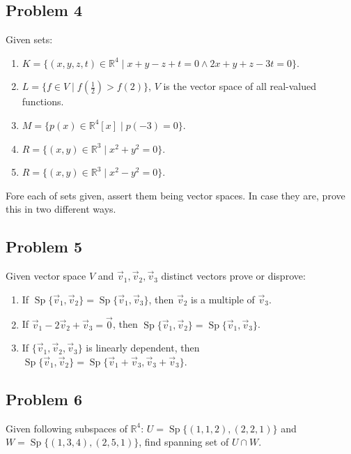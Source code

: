 \documentclass[11pt]{article}
\DeclareMathOperator{\Sp}{Sp}
\begin{document}
\subsection{Problem 4}
\label{sec-1-4}
Given sets:
\begin{enumerate}
\item $K = \{(x,y,z,t) \in \mathbb{R}^4\;|\; x+y-z+t=0 \land 2x+y+z-3t=0\}$.
\item $L = \{f \in V\;|\; f\left(\frac{1}{2}\right)>f(2)\}$, $V$ is the vector
space of all real-valued functions.
\item $M = \{p(x) \in \mathbb{R}^4[x]\;|\; p(-3) = 0\}$.
\item $R = \{(x,y) \in \mathbb{R}^3\;|\; x^2 + y^2 = 0\}$.
\item $R = \{(x,y) \in \mathbb{R}^3\;|\; x^2 - y^2 = 0\}$.
\end{enumerate}

Fore each of sets given, assert them being vector spaces.  In case they are,
prove this in two different ways.

\subsection{Problem 5}
\label{sec-1-5}
Given vector space $V$ and $\vec{v}_1, \vec{v}_2, \vec{v}_3$ distinct vectors
prove or disprove:
\begin{enumerate}
\item If $\Sp\{\vec{v}_1, \vec{v}_2\} = \Sp\{\vec{v}_1, \vec{v}_3\}$, then
$\vec{v}_2$ is a multiple of $\vec{v}_3$.
\item If $\vec{v}_1 - 2\vec{v}_2 + \vec{v}_3 = \vec{0}$, then 
$\Sp\{\vec{v}_1, \vec{v}_2\} = \Sp\{\vec{v}_1, \vec{v}_3\}$.
\item If $\{\vec{v}_1, \vec{v}_2, \vec{v}_3\}$ is linearly dependent, then
$\Sp\{\vec{v}_1, \vec{v}_2\} = \Sp\{\vec{v}_1 + \vec{v}_3, \vec{v}_3 +
      \vec{v}_3\}$.
\end{enumerate}

\subsection{Problem 6}
\label{sec-1-6}
Given following subspaces of $\mathbb{R}^4$:
$U = \Sp\{(1,1,2), (2,2,1)\}$ and $W = \Sp\{(1,3,4), (2,5,1)\}$,
find spanning set of $U \cap W$.
\end{document}

